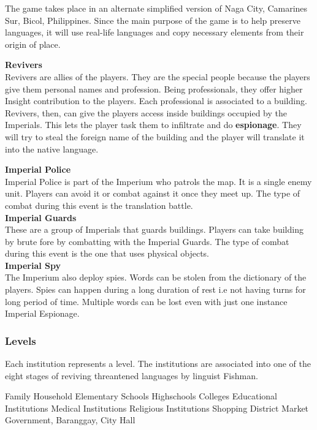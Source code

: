\documentclass[11pt]{article}
\begin{document}
The game takes place in an alternate simplified version of Naga City, Camarines Sur, Bicol, Philippines. Since the main purpose of the game is to help preserve languages, it will use real-life languages and copy necessary elements from their origin of place.

\textbf{Revivers}\\
Revivers are allies of the players. They are the special people because the players give them personal names and profession. Being professionals, they offer higher Insight contribution to the players. Each professional is associated to a building. Revivers, then, can give the players access inside buildings occupied by the Imperials. This lets the player task them to infiltrate and do \textbf{espionage}. They will try to steal the foreign name of the building and the player will translate it into the native language.

\textbf{Imperial Police}\\
Imperial Police is part of the Imperium who patrols the map. It is a single enemy unit. Players can avoid it or combat against it once they meet up. The type of combat during this event is the translation battle.\\

\textbf{Imperial Guards}\\
These are a group of Imperials that guards buildings. Players can take building by brute fore by combatting with the Imperial Guards. The type of combat during this event is the one that uses physical objects.\\

\textbf{Imperial Spy}\\
The Imperium also deploy spies. Words can be stolen from the dictionary of the players. Spies can happen during a long duration of rest i.e not having turns for long period of time. Multiple words can be lost even with just one instance Imperial Espionage.\\


\subsubsection{Levels}
Each institution represents a level. The institutions are associated into one of the eight stages of reviving threantened languages by linguist Fishman.


Family Household
Elementary Schools
Highschools
Colleges
Educational Institutions
Medical Institutions
Religious Institutions
Shopping District
Market
Government, Baranggay, City Hall
\end{document}
